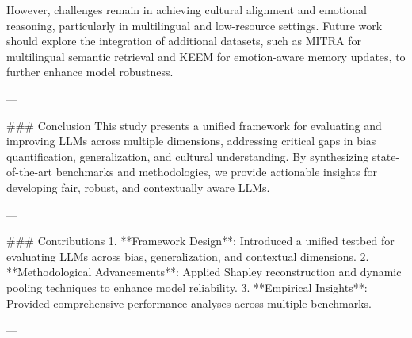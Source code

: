 However, challenges remain in achieving cultural alignment and emotional reasoning, particularly in multilingual and low-resource settings. Future work should explore the integration of additional datasets, such as MITRA for multilingual semantic retrieval and KEEM for emotion-aware memory updates, to further enhance model robustness.

---

### Conclusion  
This study presents a unified framework for evaluating and improving LLMs across multiple dimensions, addressing critical gaps in bias quantification, generalization, and cultural understanding. By synthesizing state-of-the-art benchmarks and methodologies, we provide actionable insights for developing fair, robust, and contextually aware LLMs.

---

### Contributions  
1. **Framework Design**: Introduced a unified testbed for evaluating LLMs across bias, generalization, and contextual dimensions.  
2. **Methodological Advancements**: Applied Shapley reconstruction and dynamic pooling techniques to enhance model reliability.  
3. **Empirical Insights**: Provided comprehensive performance analyses across multiple benchmarks.  

---